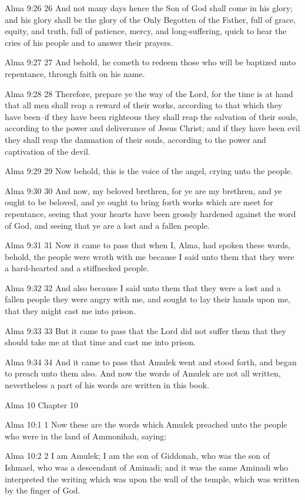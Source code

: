 Alma 9:26
 26 And not many days hence the Son of God shall come in his
glory; and his glory shall be the glory of the Only Begotten of
the Father, full of grace, equity, and truth, full of patience,
mercy, and long-suffering, quick to hear the cries of his people
and to answer their prayers.

Alma 9:27
 27 And behold, he cometh to redeem those who will be baptized
unto repentance, through faith on his name.

Alma 9:28
 28 Therefore, prepare ye the way of the Lord, for the time is at
hand that all men shall reap a reward of their works, according
to that which they have been--if they have been righteous they
shall reap the salvation of their souls, according to the power
and deliverance of Jesus Christ; and if they have been evil they
shall reap the damnation of their souls, according to the power
and captivation of the devil.

Alma 9:29
 29 Now behold, this is the voice of the angel, crying unto the
people.

Alma 9:30
 30 And now, my beloved brethren, for ye are my brethren, and ye
ought to be beloved, and ye ought to bring forth works which are
meet for repentance, seeing that your hearts have been grossly
hardened against the word of God, and seeing that ye are a lost
and a fallen people.

Alma 9:31
 31 Now it came to pass that when I, Alma, had spoken these
words, behold, the people were wroth with me because I said unto
them that they were a hard-hearted and a stiffnecked people.

Alma 9:32
 32 And also because I said unto them that they were a lost and a
fallen people they were angry with me, and sought to lay their
hands upon me, that they might cast me into prison.

Alma 9:33
 33 But it came to pass that the Lord did not suffer them that
they should take me at that time and cast me into prison.

Alma 9:34
 34 And it came to pass that Amulek went and stood forth, and
began to preach unto them also. And now the words of Amulek are
not all written, nevertheless a part of his words are written in
this book.

Alma 10
Chapter 10

Alma 10:1
 1 Now these are the words which Amulek preached unto the people
who were in the land of Ammonihah, saying:

Alma 10:2
 2 I am Amulek; I am the son of Giddonah, who was the son of
Ishmael, who was a descendant of Aminadi; and it was the same
Aminadi who interpreted the writing which was upon the wall of
the temple, which was written by the finger of God.

